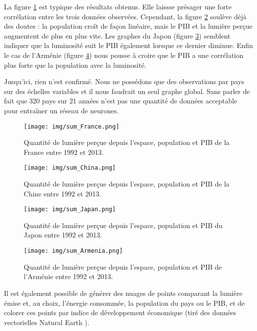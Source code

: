 \documentclass[a4paper, 11pt]{report}
\begin{document}
La figure \ref{sum_France} est typique des résultats obtenus. Elle laissse présager une forte corrélation entre les trois données observées. Cependant, la figure \ref{sum_China} soulève déjà des doutes : la population croît de façon linéaire, mais le PIB et la lumière perçue augmentent de plus en plus vite. Les graphes du Japon (figure \ref{sum_Japan}) semblent indiquer que la luminosité suit le PIB également lorsque ce dernier diminue. Enfin le cas de l'Arménie (figure \ref{sum_Armenia}) nous pousse à croire que le PIB a une corrélation plus forte que la population avec la luminosité.

Jusqu'ici, rien n'est confirmé. Nous ne possédons que des observations par pays sur des échelles variables et il nous faudrait un seul graphe global. Sans parler de fait que 320 pays sur 21 années n'est pas une quantité de données acceptable pour entraîner un réseau de neurones.

\begin{figure}[h]
	\centering
	\texttt{[image: img/sum\_France.png]}
	\caption{Quantité de lumière perçue depuis l'espace, population et PIB de la France entre 1992 et 2013.}
	\label{sum_France}
\end{figure}


\begin{figure}[h]
	\centering
	\texttt{[image: img/sum\_China.png]}
	\caption{Quantité de lumière perçue depuis l'espace, population et PIB de la Chine entre 1992 et 2013.}
	\label{sum_China}
\end{figure}


\begin{figure}[h]
	\centering
	\texttt{[image: img/sum\_Japan.png]}
	\caption{Quantité de lumière perçue depuis l'espace, population et PIB du Japon entre 1992 et 2013.}
	\label{sum_Japan}
\end{figure}


\begin{figure}[h]
	\centering
	\texttt{[image: img/sum\_Armenia.png]}
	\caption{Quantité de lumière perçue depuis l'espace, population et PIB de l'Arménie entre 1992 et 2013.}
	\label{sum_Armenia}
\end{figure}

Il est également possible de générer des nuages de points comparant la lumière émise et, au choix, l'énergie consommée, la population du pays ou le PIB, et de colorer ces points par indice de développement économique (tiré des données vectorielles Natural Earth \cite{naturalearthdata}).
\end{document}
